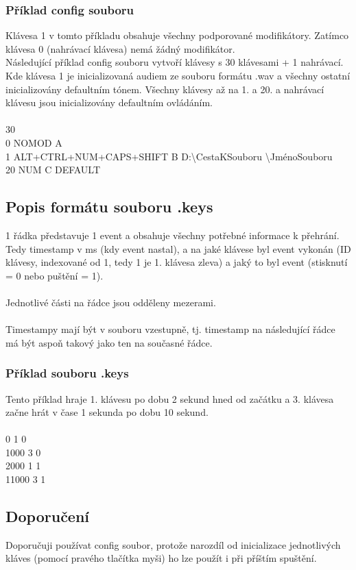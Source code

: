 \documentclass[12pt]{article}
\begin{document}
	\newpage
	\subsubsection{Příklad config souboru}
	Klávesa 1 v tomto příkladu obsahuje všechny podporované modifikátory. Zatímco klávesa 0 (nahrávací klávesa) nemá žádný modifikátor.
	\\
	Následující příklad config souboru vytvoří klávesy s 30 klávesami + 1 nahrávací. Kde klávesa 1 je inicializovaná audiem ze souboru formátu .wav a všechny ostatní inicializovány defaultním tónem. Všechny klávesy až na 1. a 20. a nahrávací klávesu jsou inicializovány defaultním ovládáním.
	\\
	\\
	30
	\\
	0 NOMOD A
	\\
	1 ALT+CTRL+NUM+CAPS+SHIFT B D:\textbackslash CestaKSouboru \textbackslash JménoSouboru
	\\
	20 NUM C DEFAULT
	
	\newpage
	\subsection{Popis formátu souboru .keys}
	1 řádka představuje 1 event a obsahuje všechny potřebné informace k přehrání. Tedy timestamp v ms (kdy event nastal), a na jaké klávese byl event vykonán (ID klávesy, indexované od 1, tedy 1 je 1. klávesa zleva) a jaký to byl event (stisknutí = 0 nebo puštění = 1).
	\\
	\\
	Jednotlivé části na řádce jsou odděleny mezerami.
	\\
	\\
	Timestampy mají být v souboru vzestupně, tj. timestamp na následující řádce má být aspoň takový jako ten na současné řádce.
	
	\subsubsection{Příklad souboru .keys}
	Tento příklad hraje 1. klávesu po dobu 2 sekund hned od začátku a 3. klávesa začne hrát v čase 1 sekunda po dobu 10 sekund.
	\\
	\\ 
	0 1 0
	\\
	1000 3 0
	\\
	2000 1 1
	\\
	11000 3 1
	
	\subsection{Doporučení}
	Doporučuji používat config soubor, protože narozdíl od inicializace jednotlivých kláves (pomocí pravého tlačítka myši) ho lze použít i při příštím spuštění.
	
\end{document}
